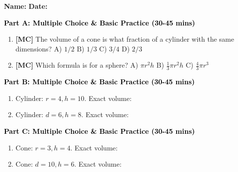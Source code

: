 \documentclass[12pt, letterpaper, fleqn]{article}
\newcommand{\blank}{\underline{\hspace{2.2cm}}}
\begin{document}
\textbf{Name:} \underline{\hspace{5cm}}
\hfill
\textbf{Date:} \underline{\hspace{3cm}}\\


\begin{tcolorbox}[colback=customteal!20]
\large\textcolor{black}{\textbf{Part A: Multiple Choice \& Basic Practice (30-45 mins)}}
\end{tcolorbox}

\vspace{3mm}

\begin{enumerate}[itemsep=2.5cm, leftmargin=0.6cm]
\item \textbf{[MC]} The volume of a cone is what fraction of a cylinder with the same dimensions?
A) $1/2$ \quad B) $1/3$ \quad C) $3/4$ \quad D) $2/3$
\item \textbf{[MC]} Which formula is for a sphere?
A) $\pi r^2 h$ \quad B) $\frac{1}{3} \pi r^2 h$ \quad C) $\frac{4}{3} \pi r^3$
\end{enumerate}

\newpage

\begin{tcolorbox}[colback=customteal!20]
\large\textcolor{black}{\textbf{Part B: Multiple Choice \& Basic Practice (30-45 mins)}}
\end{tcolorbox}

\vspace{3mm}

\begin{enumerate}[itemsep=2.5cm, leftmargin=0.6cm, resume]
\item Cylinder: $r=4, h=10$. Exact volume: \blank
\item Cylinder: $d=6, h=8$. Exact volume: \blank
\end{enumerate}

\newpage

\begin{tcolorbox}[colback=customteal!20]
\large\textcolor{black}{\textbf{Part C: Multiple Choice \& Basic Practice (30-45 mins)}}
\end{tcolorbox}

\vspace{3mm}

\begin{enumerate}[itemsep=2.5cm, leftmargin=0.6cm, resume]
\item Cone: $r=3, h=4$. Exact volume: \blank
\item Cone: $d=10, h=6$. Exact volume: \blank
\end{enumerate}
\end{document}
